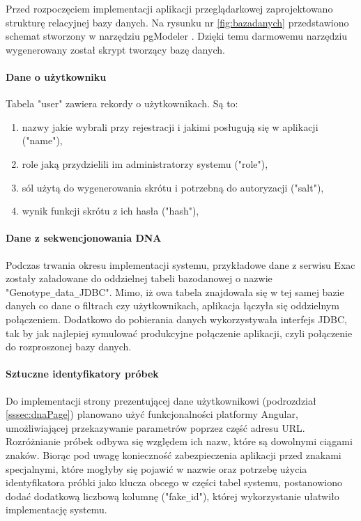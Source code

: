 \documentclass[a4paper,12pt,twoside]{article}
\begin{document}
\restoregeometry
\newpage

Przed rozpoczęciem implementacji aplikacji przeglądarkowej zaprojektowano strukturę 
relacyjnej bazy danych. Na rysunku nr \ref{fig:bazadanych} przedstawiono schemat stworzony
w narzędziu pgModeler \cite{pgModeler}. Dzięki temu darmowemu narzędziu wygenerowany został
skrypt tworzący bazę danych.  

\paragraph{Dane o użytkowniku} Tabela "user" zawiera rekordy o użytkownikach. 
Są to:
\begin{enumerate}[1)]
\item nazwy jakie wybrali przy rejestracji i jakimi posługują się w aplikacji ("name"),
\item role jaką przydzielili im administratorzy systemu ("role"),
\item sól użytą do wygenerowania skrótu i potrzebną do autoryzacji ("salt"),
\item wynik funkcji skrótu z ich hasła ("hash"),
\end{enumerate}

\paragraph{Dane z sekwencjonowania DNA} Podczas trwania okresu implementacji systemu,
przykładowe dane z serwisu Exac zostały załadowane do oddzielnej tabeli bazodanowej o nazwie "Genotype\verb!_!data\verb!_!JDBC". Mimo, iż owa tabela znajdowała się w tej samej bazie danych co 
dane o filtrach czy użytkownikach, aplikacja łączyła się oddzielnym połączeniem. 
Dodatkowo do pobierania danych wykorzystywała interfejs JDBC, tak by jak najlepiej
symulować produkcyjne połączenie aplikacji, czyli połączenie do rozproszonej bazy danych.

\paragraph{Sztuczne identyfikatory próbek} Do implementacji strony
prezentującej dane użytkownikowi (podrozdział \ref{sssec:dnaPage}) planowano użyć 
funkcjonalności platformy Angular, umożliwiającej przekazywanie parametrów 
poprzez część adresu URL. Rozróżnianie próbek odbywa się względem ich nazw, które
są dowolnymi ciągami znaków. Biorąc pod uwagę konieczność zabezpieczenia aplikacji przed 
znakami specjalnymi, które mogłyby się pojawić w nazwie oraz potrzebę
użycia identyfikatora próbki jako klucza obcego w części tabel systemu, postanowiono
dodać dodatkową liczbową kolumnę ("fake\verb!_!id"), której wykorzystanie ułatwiło implementację systemu.
\end{document}
